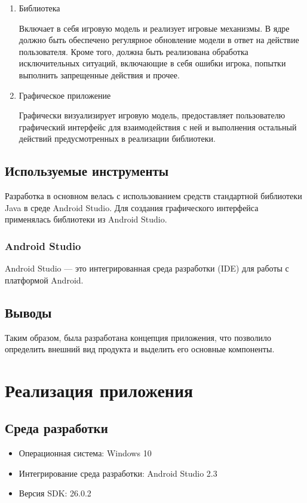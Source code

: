	\begin{enumerate}
		\item Библиотека
		
		Включает в себя игровую модель и реализует игровые механизмы. В ядре должно быть обеспечено регулярное обновление модели в ответ на действие пользователя. Кроме того, должна быть реализована обработка исключительных ситуаций, включающие в себя ошибки игрока, попытки выполнить запрещенные действия и прочее.
		
		\item Графическое приложение 
		
		Графически визуализирует игровую модель, предоставляет пользователю графический интерфейс для взаимодействия с ней и выполнения остальный действий предусмотренных в реализации библиотеки. 
	\end{enumerate}
	
	\subsection{Используемые инструменты}
	
	Разработка в основном велась с использованием средств стандартной библиотеки Java в среде Android Studio. Для создания графического интерфейса применялась библиотеки из Android Studio. 
	
	\subsubsection{Android Studio}
	
	Android Studio — это интегрированная среда разработки (IDE) для работы с платформой Android.
	
	\subsection{Выводы}
	Таким образом, была разработана концепция приложения, что позволило определить внешний вид продукта и выделить его основные компоненты.
	
	\section{Реализация приложения}
	
	\subsection{Среда разработки}
	
	\begin{itemize}
		\item Операционная система: Windows 10
		\item Интегрирование среда разработки: Android Studio 2.3
		\item Версия SDK: 26.0.2
	\end{itemize}
	
